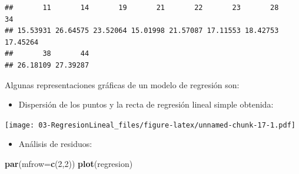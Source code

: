 \documentclass[]{book}
\newenvironment{Shaded}{\begin{snugshade}}{\end{snugshade}}
\newcommand{\DataTypeTok}[1]{\textcolor[rgb]{0.13,0.29,0.53}{#1}}
\newcommand{\DecValTok}[1]{\textcolor[rgb]{0.00,0.00,0.81}{#1}}
\newcommand{\KeywordTok}[1]{\textcolor[rgb]{0.13,0.29,0.53}{\textbf{#1}}}
\newcommand{\NormalTok}[1]{#1}
\newcommand{\OperatorTok}[1]{\textcolor[rgb]{0.81,0.36,0.00}{\textbf{#1}}}
\newcommand{\StringTok}[1]{\textcolor[rgb]{0.31,0.60,0.02}{#1}}
\providecommand{\tightlist}{%
  \setlength{\itemsep}{0pt}\setlength{\parskip}{0pt}}
\begin{document}
\begin{verbatim}
##       11       14       19       21       22       23       28       34 
## 15.53931 26.64575 23.52064 15.01998 21.57087 17.11553 18.42753 17.45264 
##       38       44 
## 26.18109 27.39287
\end{verbatim}

Algunas representaciones gráficas de un modelo de regresión son:

\begin{itemize}
\tightlist
\item
  Dispersión de los puntos y la recta de regresión lineal simple obtenida:
\end{itemize}

\begin{Shaded}
\end{Shaded}

\texttt{[image: 03-RegresionLineal\_files/figure-latex/unnamed-chunk-17-1.pdf]}

\begin{itemize}
\tightlist
\item
  Análisis de residuos:
\end{itemize}

\begin{Shaded}
\begin{Highlighting}[]
\KeywordTok{par}\NormalTok{(}\DataTypeTok{mfrow=}\KeywordTok{c}\NormalTok{(}\DecValTok{2}\NormalTok{,}\DecValTok{2}\NormalTok{))}
\KeywordTok{plot}\NormalTok{(regresion)}
\end{Highlighting}
\end{Shaded}
\end{document}
